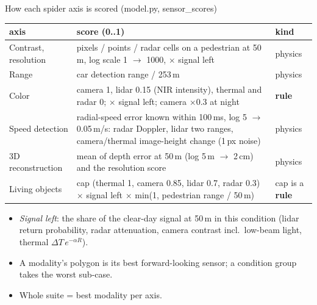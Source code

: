 \documentclass[aspectratio=169,11pt]{beamer}
\begin{document}
\begin{frame}{How each spider axis is scored (model.py, sensor\_scores)}
  \footnotesize
  \renewcommand{\arraystretch}{1.2}
  \begin{tabular}{@{}L{2.7cm} L{8.2cm} L{3.0cm}@{}}
    \toprule
    axis & score (0..1) & kind \\
    \midrule
    Contrast, resolution & pixels / points / radar cells on a pedestrian at 50\,m, log scale 1 $\to$ 1000, $\times$ signal left & physics \\
    Range & car detection range / 253\,m & physics \\
    Color & camera 1, lidar 0.15 (NIR intensity), thermal and radar 0; $\times$ signal left; camera $\times$0.3 at night & \textbf{rule} \\
    Speed detection & radial-speed error known within 100\,ms, log 5 $\to$ 0.05\,m/s: radar Doppler, lidar two ranges,
      camera/thermal image-height change (1\,px noise) & physics \\
    3D reconstruction & mean of depth error at 50\,m (log 5\,m $\to$ 2\,cm) and the resolution score & physics \\
    Living objects & cap (thermal 1, camera 0.85, lidar 0.7, radar 0.3) $\times$ signal left $\times$ min(1, pedestrian range / 50\,m) & cap is a \textbf{rule} \\
    \bottomrule
  \end{tabular}

  \vspace{0.6em}
  \begin{itemize}
    \item \emph{Signal left}: the share of the clear-day signal at 50\,m in this condition (lidar return probability,
      radar attenuation, camera contrast incl.\ low-beam light, thermal $\Delta T\,e^{-\alpha R}$).
    \item A modality's polygon is its best forward-looking sensor; a condition group takes the worst sub-case.
    \item Whole suite = best modality per axis.
  \end{itemize}
\end{frame}
\end{document}
